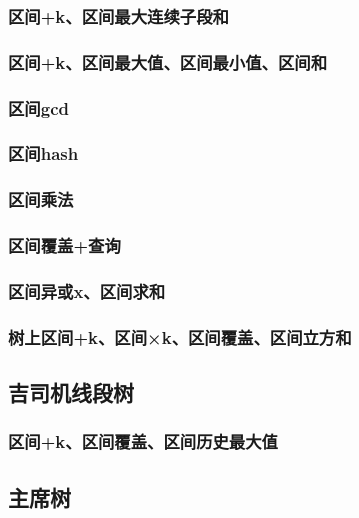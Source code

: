 \documentclass[10pt,a4paper]{article}
\begin{document}
\subsubsection{区间+k、区间最大连续子段和}

\subsubsection{区间+k、区间最大值、区间最小值、区间和}

\subsubsection{区间gcd}

\subsubsection{区间hash}

\subsubsection{区间乘法}

\subsubsection{区间覆盖+查询}

\subsubsection{区间异或x、区间求和}

\subsubsection{树上区间+k、区间×k、区间覆盖、区间立方和}

\subsection{吉司机线段树}
\subsubsection{区间+k、区间覆盖、区间历史最大值}

\subsection{主席树}
\end{document}
